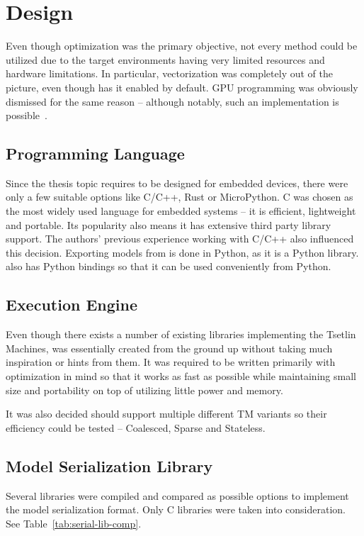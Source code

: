 \FloatBarrier

\section{Design}\label{sec:design}
Even though optimization was the primary objective, not every method could be utilized due to the target environments having very limited resources and hardware limitations. In particular, vectorization was completely out of the picture, even though \GreenTsetlinName has it enabled by default. GPU programming was obviously dismissed for the same reason -- although notably, such an implementation is possible~\cite{granmo2020pytsetlinmachinecuda}.

\subsection{Programming Language}
Since the thesis topic requires \LibraryName to be designed for embedded devices, there were only a few suitable options like C/C++, Rust or MicroPython. C was chosen as the most widely used language for embedded systems -- it is efficient, lightweight and portable. Its popularity also means it has extensive third party library support. The authors' previous experience working with C/C++ also influenced this decision.  
Exporting models from \GreenTsetlinName is done in Python, as it is a Python library.  
\LibraryName also has Python bindings so that it can be used conveniently from Python.

\subsection{Execution Engine}
Even though there exists a number of existing libraries implementing the Tsetlin Machines, \LibraryName was essentially created from the ground up without taking much inspiration or hints from them. It was required to be written primarily with optimization in mind so that it works as fast as possible while maintaining small size and portability on top of utilizing little power and memory.

It was also decided \LibraryName should support multiple different TM variants so their efficiency could be tested -- Coalesced, Sparse and Stateless.

\subsection{Model Serialization Library}
Several libraries were compiled and compared as possible options to implement the model serialization format. Only C libraries were taken into consideration. See Table~\ref{tab:serial-lib-comp}.


